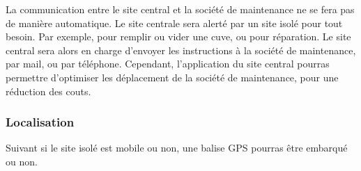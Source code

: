             La communication entre le site central et la société de maintenance ne se fera pas de manière automatique.
            Le site centrale sera alerté par un site isolé pour tout besoin. Par exemple, pour remplir ou vider une cuve, ou pour réparation.
            Le site central sera alors en charge d'envoyer les instructions à la société de maintenance, par mail, ou par téléphone.
            Cependant, l'application du site central pourras permettre d'optimiser les déplacement de la société de maintenance, pour une réduction des couts.
            
        \subsubsection{Localisation}
        
            Suivant si le site isolé est mobile ou non, une balise GPS pourras être embarqué ou non.
